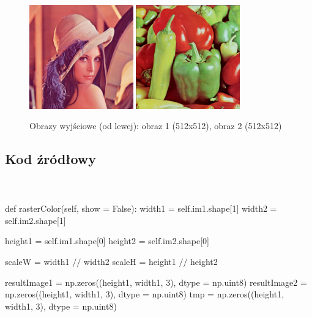 \documentclass[final,a4paper,openany,12pt]{mwbk}
\begin{document}
\begin{figure}[H]
	\begin{center}
		\includegraphics[width=0.4\textwidth]{lena_color_unificationRas_result}
		\includegraphics[width=0.4\textwidth]{peppers_color_unificationRas_result}
	\end{center}
	\caption{Obrazy wyjściowe (od lewej): obraz 1 (512x512), obraz 2 (512x512)}
\end{figure}

\subsection*{Kod źródłowy}
\hfill
\\\\
\noindent def rasterColor(self, show = False): \newline
\indent width1 = self.im1.shape[1] \newline
\indent width2 = self.im2.shape[1] \newline

height1 = self.im1.shape[0] \newline
\indent height2 = self.im2.shape[0] \newline

scaleW = width1 $//$ width2 \newline
\indent scaleH = height1 $//$ height2 \newline

resultImage1 = np.zeros((height1, width1, 3), dtype = np.uint8) \newline
\indent resultImage2 = np.zeros((height1, width1, 3), dtype = np.uint8) \newline
\indent tmp = np.zeros((height1, width1, 3), dtype = np.uint8) \newline
\end{document}
